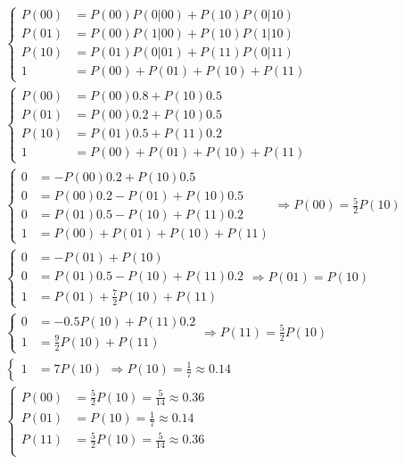 \documentclass{article}
\begin{document}
\begin{align*}
    &\begin{cases}
    P(00) &= P(00)P(0|00) + P(10)P(0|10)\\
    P(01) &= P(00)P(1|00) + P(10)P(1|10)\\
    P(10) &= P(01)P(0|01) + P(11)P(0|11)\\
    1 &= P(00) + P(01) + P(10) + P(11)
    \end{cases}\\
    &\begin{cases}
    P(00) &= P(00)0.8 + P(10)0.5\\
    P(01) &= P(00)0.2 + P(10)0.5\\
    P(10) &= P(01)0.5 + P(11)0.2\\
    1 &= P(00) + P(01) + P(10) + P(11)
    \end{cases}\\
    &\begin{cases}
    0 &= - P(00)0.2 + P(10)0.5\\
    0 &= P(00)0.2 - P(01) + P(10)0.5\\
    0 &= P(01)0.5 - P(10) + P(11)0.2\\
    1 &= P(00) + P(01) + P(10) + P(11)
    \end{cases}\Rightarrow P(00) = \frac{5}{2}P(10)\\
    &\begin{cases}
    0 &= - P(01) + P(10)\\
    0 &= P(01)0.5 - P(10) + P(11)0.2\\
    1 &= P(01) + \frac{7}{2}P(10) + P(11)
    \end{cases}\Rightarrow P(01) = P(10)\\
    &\begin{cases}
        0 &= - 0.5P(10) + P(11)0.2\\
        1 &= \frac{9}{2}P(10) + P(11)
    \end{cases}\Rightarrow P(11) = \frac{5}{2}P(10)\\
    &\begin{cases}
        1 &= 7P(10)
    \end{cases}\Rightarrow P(10) = \frac{1}{7}\approx 0.14\\
    &\begin{cases}
        P(00) &= \frac{5}{2}P(10) = \frac{5}{14}\approx 0.36\\
        P(01) &= P(10) = \frac{1}{7}\approx 0.14\\
        P(11) &= \frac{5}{2}P(10) = \frac{5}{14}\approx 0.36\\
    \end{cases}
\end{align*}
\end{document}

